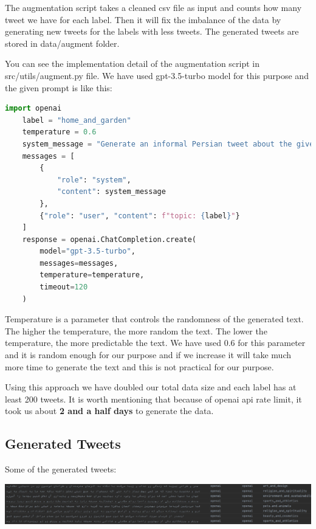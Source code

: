\documentclass[12pt, letterpaper]{article}
\begin{document}
    The augmentation script takes a cleaned csv file as input and counts how many tweet we have for each label. Then it will fix the imbalance of the data by generating new tweets for the labels with less tweets. The generated tweets are stored in data\slash augment folder.

    You can see the implementation detail of the augmentation script in src\slash utils\slash augment.py file. We have used gpt-3.5-turbo model for this purpose and the given prompt is like this:
    \begin{lstlisting}[language=Python]
    import openai
    label = "home_and_garden"
    temperature = 0.6
    system_message = "Generate an informal Persian tweet about the given topic without any hashtags, mentions, links, or emojis."  # noqa
    messages = [
        {
            "role": "system",
            "content": system_message
        },
        {"role": "user", "content": f"topic: {label}"}
    ]
    response = openai.ChatCompletion.create(
        model="gpt-3.5-turbo",
        messages=messages,
        temperature=temperature,
        timeout=120
    )
    \end{lstlisting}
    Temperature is a parameter that controls the randomness of the generated text. The higher the temperature, the more random the text. The lower the temperature, the more predictable the text. We have used 0.6 for this parameter and it is random enough for our purpose and if we increase it will take much more time to generate the text and this is not practical for our purpose.

    Using this approach we have doubled our total data size and each label has at least 200 tweets. It is worth mentioning that because of openai api rate limit, it took us about \textbf{2 and a half days} to generate the data.

    \subsection{Generated Tweets}\label{subsec:generated-tweets}
    Some of the generated tweets:
    \begin{center}
        \includegraphics[width=1\textwidth]{images/generated_tweets.png}
    \end{center}
\end{document}
